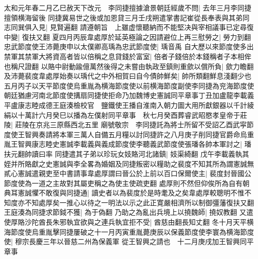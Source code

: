 太和元年春二月乙巳赦天下改元　李同捷擅據滄景朝廷經歲不問|{
	去年三月李同捷擅領横海留後}
同捷冀易世之後或加恩貸三月壬戌朔遣掌書記崔從長奉表與其弟同志同巽俱入見|{
	見賢遍翻}
請遵朝旨　上雖虚懷聽納而不能堅决與宰相議事已定尋復中變|{
	復扶又翻}
夏四月丙辰韋處厚於延英極論之因請避位上再三慰勞之|{
	勞力到翻}
忠武節度使王沛薨庚申以太僕卿高瑀為忠武節度使|{
	瑀音禹}
自大歷以來節度使多出禁軍其禁軍大將資高者皆以倍稱之息貸錢於富室|{
	倍者子錢倍於本錢稱者子本相侔也稱尺證翻}
以賂中尉動踰億萬然後得之未嘗由執政至鎮則重歛以償所負|{
	歛力瞻翻}
及沛薨裴度韋處厚始奏以瑀代之中外相賀曰自今債帥鮮矣|{
	帥所類翻鮮息淺翻少也}
五月丙子以天平節度使烏重胤為横海節度使以前横海節度副使李同捷為兖海節度使朝廷猶慮河南北節度使搆扇同捷使拒命乃加魏博史憲誠同平章事丁丑加盧龍李載義平盧康志睦成德王庭湊檢校官　鹽鐵使王播自淮南入朝力圖大用所獻銀器以千計綾絹以十萬計六月癸巳以播為左僕射同平章事　秋七月癸酉葬睿武昭愍孝皇帝于莊陵|{
	莊陵在京兆三原縣西北五里}
廟號敬宗　李同捷託為將士所留不受詔乙酉武寜節度使王智興奏請將本軍三萬人自備五月糧以討同捷許之八月庚子削同捷官爵命烏重胤王智興康志睦史憲誠李載義與義成節度使李聽義武節度使張璠各帥本軍討之|{
	璠扶元翻帥讀曰率}
同捷遣其子弟以珍玩女妓賂河北諸鎮|{
	妓渠綺翻}
戊午李載義執其姪并所賂獻之史憲誠與李全畧為婚姻及同捷叛密以糧助之裴度不知其所為謂憲誠無貳心憲誠遣親吏至中書請事韋處厚謂曰晉公於上前以百口保爾使主|{
	裴度封晉國公節度使為一道之主故對其屬吏稱之為使主使疏吏翻}
處厚則不然但仰俟所為自有朝典耳憲誠懼不敢復與同捷通|{
	讀史者以為裴度於是時耄及之矣韋處厚較聰明不惟不知度亦不知處厚矣一推心以待之一明法以示之此正寛嚴相濟所以制御彊藩復扶又翻}
王庭湊為同捷求節鉞不獲|{
	為于偽翻}
乃助之為亂出兵境上以撓魏師|{
	撓奴教翻}
又遣使厚賂沙陀酋長朱邪執宜欲與之連兵執宜拒不受|{
	酋慈由翻長知丈翻}
冬十月天平横海節度使烏重胤擊同捷屢破之十一月丙寅重胤薨庚辰以保義節度使李寰為横海節度使|{
	穆宗長慶三年以晉慈二州為保義軍}
從王智興之請也　十二月庚戌加王智興同平章事


